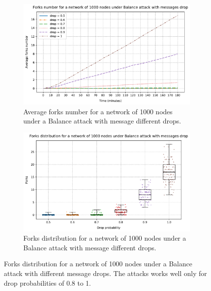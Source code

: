 \begin{figure}[ht]
	\begin{subfigure}{\textwidth}
		\centering
		\includegraphics[width=\myplotswitdth \columnwidth]{plots/forks_attack_drop_linechart}
		\vspace*{0.25cm}
		\caption{Average forks number for a network of \num{1000} nodes under a Balance attack with message different drops.}
		\vspace*{0.75cm}
	\end{subfigure}
	\begin{subfigure}{\textwidth}
		\centering
		\vspace*{0.25cm}
		\includegraphics[width=\myplotswitdth \columnwidth]{plots/forks_attack_drop_boxplot}
		\vspace*{0.25cm}
		\caption{Forks distribution for a network of \num{1000} nodes under a Balance attack with message different drops.}
		\vspace*{0.25cm}
	\end{subfigure}
	\caption[Forks distribution for a network of \num{1000} nodes under a Balance attack with different message drops]{
		Forks distribution for a network of \num{1000} nodes under a Balance attack with different message drops.
		The attacks works well only for drop probabilities of \num{0.8} to \num{1}.
	}
	\label{fig:forks-attack-drop}
\end{figure}

